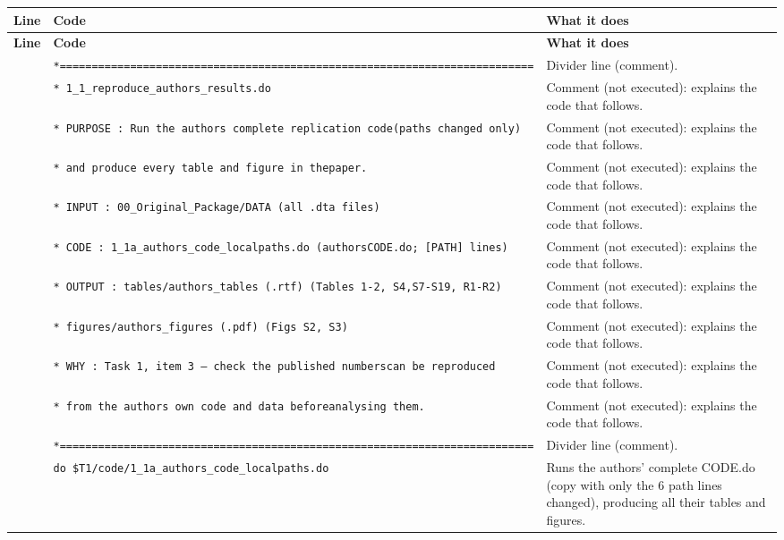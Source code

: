 \documentclass[10pt]{article}
\newcommand{\codetable}[1]{%
{\footnotesize
\begin{longtable}{>{\raggedleft\arraybackslash}p{0.55cm}>{\raggedright\arraybackslash}p{8.3cm}>{\raggedright\arraybackslash}p{8.0cm}}
\toprule \textbf{Line} & \textbf{Code} & \textbf{What it does}\\ \midrule \endfirsthead
\toprule \textbf{Line} & \textbf{Code} & \textbf{What it does}\\ \midrule \endhead
\bottomrule \endfoot
#1
\end{longtable}}}
\begin{document}
\codetable{1 & \texttt{*=========================================================\newline \hspace*{1em}=================} & Divider line (comment).\\
2 & \texttt{* 1\_1\_reproduce\_authors\_results.do} & Comment (not executed): explains the code that follows.\\
3 & \texttt{* PURPOSE : Run the authors\textquotesingle{} complete replication code\newline \hspace*{1em}(paths changed only)} & Comment (not executed): explains the code that follows.\\
4 & \texttt{*           and produce every table and figure in the\newline \hspace*{1em}paper.} & Comment (not executed): explains the code that follows.\\
5 & \texttt{* INPUT   : 00\_Original\_Package/DATA (all .dta files)} & Comment (not executed): explains the code that follows.\\
6 & \texttt{* CODE    : 1\_1a\_authors\_code\_localpaths.do (authors\textquotesingle{}\newline \hspace*{1em}CODE.do; [PATH] lines)} & Comment (not executed): explains the code that follows.\\
7 & \texttt{* OUTPUT  : tables/authors\_tables (.rtf)  (Tables 1-{}2, S4,\newline \hspace*{1em}S7-{}S19, R1-{}R2)} & Comment (not executed): explains the code that follows.\\
8 & \texttt{*           figures/authors\_figures (.pdf) (Figs S2, S3)} & Comment (not executed): explains the code that follows.\\
9 & \texttt{* WHY     : Task 1, item 3 — check the published numbers\newline \hspace*{1em}can be reproduced} & Comment (not executed): explains the code that follows.\\
10 & \texttt{*           from the authors\textquotesingle{} own code and data before\newline \hspace*{1em}analysing them.} & Comment (not executed): explains the code that follows.\\
11 & \texttt{*=========================================================\newline \hspace*{1em}=================} & Divider line (comment).\\
12 & \texttt{do \textquotedbl{}\$T1/code/1\_1a\_authors\_code\_localpaths.do\textquotedbl{}} & Runs the authors' complete CODE.do (copy with only the 6 path lines changed), producing all their tables and figures.\\}
\end{document}
